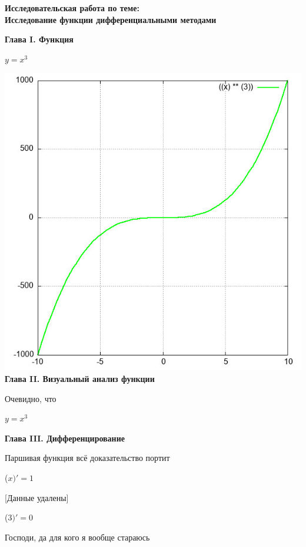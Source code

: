 \documentclass[12pt,a4paper,fleqn]{article}
\begin{document}
\begin{center}
\textbf{\LARGE{Исследовательская работа по теме:\\Исследование функции дифференциальными методами}}\end{center}\newpage\textbf{\LARGE Глава I. Функция}

\begin{center}
$y = $$x^{3}$

\end{center}
\includegraphics{GraphicDumps/plot.jpg}\newpage \textbf{\LARGE Глава II. Визуальный анализ функции}

Очевидно, что

\begin{center}
$y = $$x^{3}$

\end{center}
\newpage \textbf{\LAGRE Глава III. Дифференцирование}

Паршивая функция всё доказательство портит

\begin{center}
 ($x)'
  = 1$\end{center}
[Данные удалены]

\begin{center}
 ($3)'
  = 0$\end{center}
Господи, да для кого я вообще стараюсь
\end{document}

